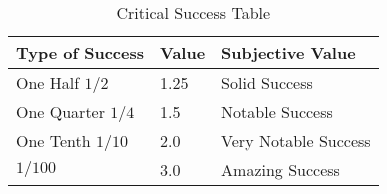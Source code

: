 \begin{table}[!h]
	\begin{tabular}{l|l|l}
	Type of Success				& Value & Subjective Value	\\
	\hline
	One Half \( 1/2 \)			& 1.25	& Solid Success		\\
        One Quarter \( 1/4 \) 	& 1.5	& Notable Success	\\
        One Tenth \( 1/10 \) 	& 2.0	& Very Notable Success	\\
        \(1/100\) 				& 3.0	& Amazing Success	\\
	\end{tabular}
	\caption{Critical Success Table}\label{Table:CriticalSuccess}
\end{table}
